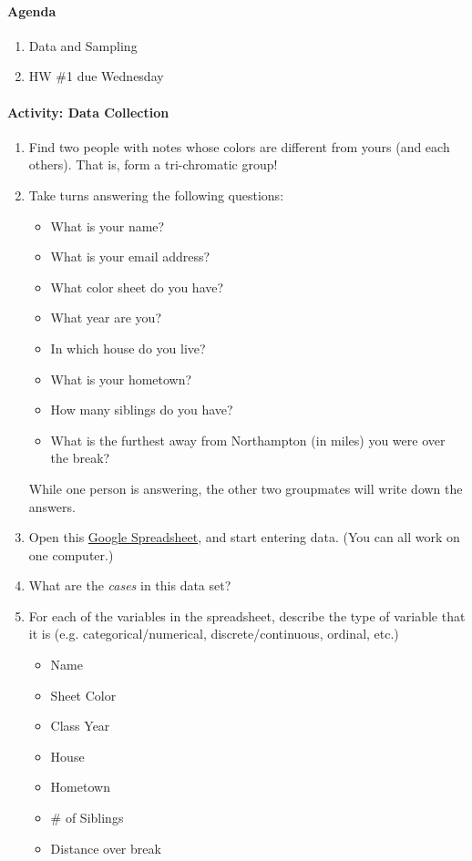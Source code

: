 \documentclass[10pt]{article}\usepackage[]{graphicx}\usepackage[]{color}
\newcommand{\ans}{\vspace{0.25in}}
\begin{document}
\paragraph{Agenda}
\begin{enumerate}
  \itemsep0em
  \item Data and Sampling
  \item HW \#1 due Wednesday
\end{enumerate}

\paragraph{Activity: Data Collection}

\begin{enumerate}

  \item Find two people with notes whose colors are different from yours (and each others). That is, form a tri-chromatic group!
  \item Take turns answering the following questions:
  \begin{itemize}
    \itemsep0em
    \item What is your name?
    \item What is your email address?
    \item What color sheet do you have?
    \item What year are you?
    \item In which house do you live?
    \item What is your hometown?
    \item How many siblings do you have?
    \item What is the furthest away from Northampton (in miles) you were over the break?
  \end{itemize}
  While one person is answering, the other two groupmates will write down the answers.

  \item Open this \href{https://docs.google.com/a/smith.edu/spreadsheets/d/18nigJczAwKBZUSH867ZkORYktAWVDJeXYz49kO6SVdo/edit?usp=sharing}{Google Spreadsheet}, and start entering data. (You can all work on one computer.)

  \item What are the \emph{cases} in this data set?
  \ans
  
  \item For each of the variables in the spreadsheet, describe the type of variable that it is (e.g. categorical/numerical, discrete/continuous, ordinal, etc.)
  \begin{itemize}
    \itemsep0.4in
    \item Name
    \item Sheet Color
    \item Class Year
    \item House
    \item Hometown
    \item \# of Siblings
    \item Distance over break
  \end{itemize}

\end{enumerate}
\end{document}
